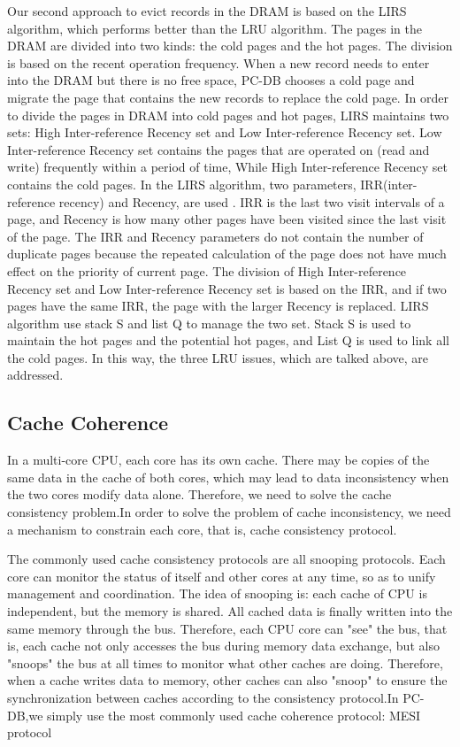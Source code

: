 Our second approach to evict records in the DRAM is based on the LIRS algorithm, which performs better than the LRU algorithm. The pages in the DRAM are divided into two kinds: the cold pages and the hot pages. The division is based on the recent operation frequency. When a new record needs to enter into the DRAM but there is no free space, PC-DB chooses a cold page and migrate the page that contains the new records to replace the cold page. In order to divide the pages in DRAM into cold pages and hot pages, LIRS maintains two sets: High Inter-reference Recency set and Low Inter-reference Recency set. Low Inter-reference Recency set contains the pages that are operated on (read and write) frequently within a period of time, While High Inter-reference Recency set contains the cold pages. In the LIRS algorithm, two parameters, IRR(inter-reference recency) and Recency, are used . IRR is the last two visit intervals of a page, and Recency is how many other pages have been visited since the last visit of the page. The IRR and Recency parameters do not contain the number of duplicate pages because the repeated calculation of the page does not have much effect on the priority of current page. The division of High Inter-reference Recency set and Low Inter-reference Recency set is based on the IRR, and if two pages have the same IRR, the page with the larger Recency is replaced. LIRS algorithm use stack S and list Q to manage the two set. Stack S is used to maintain the hot pages and the potential hot pages, and List Q is used to link all the cold pages. In this way, the three LRU issues, which are talked above, are addressed. 
\subsection{Cache Coherence}
In a multi-core CPU, each core has its own cache. There may be copies of the same data in the cache of both cores, which may lead to data inconsistency when the two cores modify data alone. Therefore, we need to solve the cache consistency problem.In order to solve the problem of cache inconsistency, we need a mechanism to constrain each core, that is, cache consistency protocol.

The commonly used cache consistency protocols are all snooping protocols. Each core can monitor the status of itself and other cores at any time, so as to unify management and coordination. The idea of snooping is: each cache of CPU is independent, but the memory is shared. All cached data is finally written into the same memory through the bus. Therefore, each CPU core can "see" the bus, that is, each cache not only accesses the bus during memory data exchange, but also "snoops" the bus at all times to monitor what other caches are doing. Therefore, when a cache writes data to memory, other caches can also "snoop" to ensure the synchronization between caches according to the consistency protocol.In PC-DB,we simply use the most commonly used cache coherence protocol: MESI protocol

